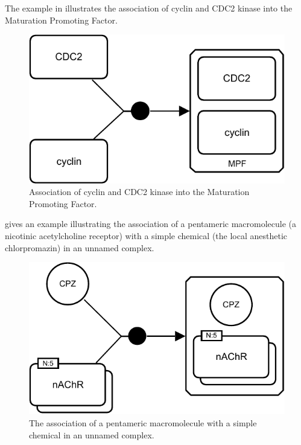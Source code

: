 The example in  illustrates the association of cyclin and CDC2 kinase into the Maturation Promoting Factor.

\begin{figure}[H]
  \centering
  \includegraphics[scale = 0.8]{examples/association-MPF}
  \caption{Association of cyclin and CDC2 kinase into the Maturation Promoting Factor.}
  \label{fig:assoc-cyclin}
\end{figure}

 gives an example illustrating the association of a pentameric macromolecule (a nicotinic acetylcholine receptor) with a simple chemical (the local anesthetic chlorpromazin) in an unnamed complex.

\begin{figure}[H]
  \centering
  \includegraphics[scale = 0.8]{examples/association-unamed}
  \caption{The association of a pentameric macromolecule with a simple chemical in an unnamed complex.}
  \label{fig:assoc-unamed}
\end{figure}

